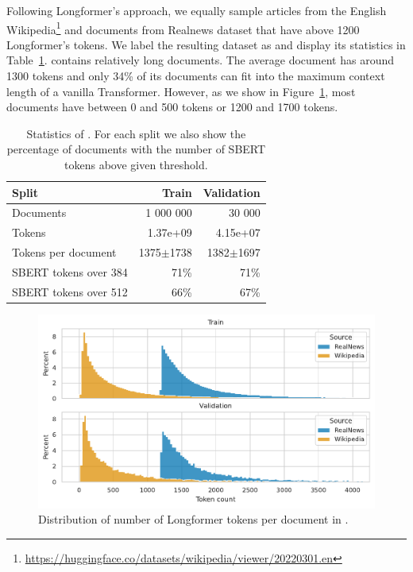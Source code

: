 Following Longformer's approach, we equally sample articles from the English
Wikipedia\footnote{\url{https://huggingface.co/datasets/wikipedia/viewer/20220301.en}}
and documents from Realnews dataset \citep{zellers2019defending} that have
above 1200 Longformer's tokens. We label the resulting dataset as
 and display its statistics in
Table~\ref{table:train_data_stats}.  contains relatively long
documents. The average document has around 1300 tokens and only 34\% of its
documents can fit into the maximum context length of a vanilla Transformer.
However, as we show in Figure~\ref{fig:train_data_dist}, most documents have
between 0 and 500 tokens or 1200 and 1700 tokens.

\begin{table}
    \centering
\begin{tabular}{lrr}
\toprule
Split & Train & Validation \\
\midrule
Documents & 1 000 000 & 30 000 \\
Tokens & 1.37e+09 & 4.15e+07 \\
Tokens per document & 1375$\pm$1738 & 1382$\pm$1697 \\
SBERT tokens over 384 & 71\% & 71\% \\
SBERT tokens over 512 & 66\% & 67\% \\
\bottomrule
\end{tabular}


    \caption{Statistics of . For each split we also show
    the percentage of documents with the number of SBERT tokens above given
    threshold.}

    \label{table:train_data_stats}

\end{table}

\begin{figure}
    \includegraphics[width=\textwidth]{./img/train_data_dist.pdf}

    \caption{Distribution of number of Longformer tokens per document in
    .}

    \label{fig:train_data_dist}
\end{figure}


